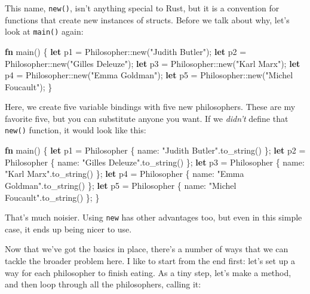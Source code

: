 \documentclass[a4paper,]{book}
\newenvironment{Shaded}{\begin{snugshade}}{\end{snugshade}}
\newcommand{\KeywordTok}[1]{\textcolor[rgb]{0.13,0.29,0.53}{\textbf{{#1}}}}
\newcommand{\StringTok}[1]{\textcolor[rgb]{0.31,0.60,0.02}{{#1}}}
\newcommand{\NormalTok}[1]{{#1}}
\begin{document}
This name, \texttt{new()}, isn't anything special to Rust, but it is a
convention for functions that create new instances of structs. Before we
talk about why, let's look at \texttt{main()} again:

\begin{Shaded}
\begin{Highlighting}[]
\KeywordTok{fn} \NormalTok{main() \{}
    \KeywordTok{let} \NormalTok{p1 = Philosopher::new(}\StringTok{"Judith Butler"}\NormalTok{);}
    \KeywordTok{let} \NormalTok{p2 = Philosopher::new(}\StringTok{"Gilles Deleuze"}\NormalTok{);}
    \KeywordTok{let} \NormalTok{p3 = Philosopher::new(}\StringTok{"Karl Marx"}\NormalTok{);}
    \KeywordTok{let} \NormalTok{p4 = Philosopher::new(}\StringTok{"Emma Goldman"}\NormalTok{);}
    \KeywordTok{let} \NormalTok{p5 = Philosopher::new(}\StringTok{"Michel Foucault"}\NormalTok{);}
\NormalTok{\}}
\end{Highlighting}
\end{Shaded}

Here, we create five variable bindings with five new philosophers. These
are my favorite five, but you can substitute anyone you want. If we
\emph{didn't} define that \texttt{new()} function, it would look like
this:

\begin{Shaded}
\begin{Highlighting}[]
\KeywordTok{fn} \NormalTok{main() \{}
    \KeywordTok{let} \NormalTok{p1 = Philosopher \{ name: }\StringTok{"Judith Butler"}\NormalTok{.to_string() \};}
    \KeywordTok{let} \NormalTok{p2 = Philosopher \{ name: }\StringTok{"Gilles Deleuze"}\NormalTok{.to_string() \};}
    \KeywordTok{let} \NormalTok{p3 = Philosopher \{ name: }\StringTok{"Karl Marx"}\NormalTok{.to_string() \};}
    \KeywordTok{let} \NormalTok{p4 = Philosopher \{ name: }\StringTok{"Emma Goldman"}\NormalTok{.to_string() \};}
    \KeywordTok{let} \NormalTok{p5 = Philosopher \{ name: }\StringTok{"Michel Foucault"}\NormalTok{.to_string() \};}
\NormalTok{\}}
\end{Highlighting}
\end{Shaded}

That's much noisier. Using \texttt{new} has other advantages too, but
even in this simple case, it ends up being nicer to use.

Now that we've got the basics in place, there's a number of ways that we
can tackle the broader problem here. I like to start from the end first:
let's set up a way for each philosopher to finish eating. As a tiny
step, let's make a method, and then loop through all the philosophers,
calling it:
\end{document}
